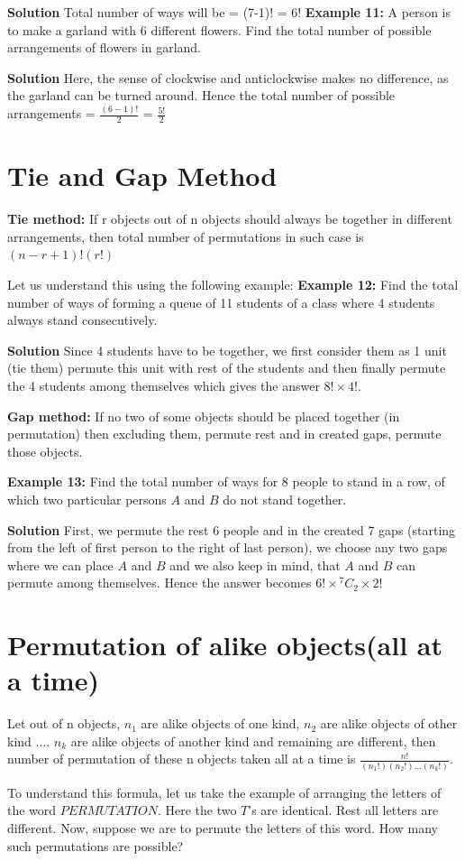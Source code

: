 \documentclass[12pt, a4paper]{article}
\begin{document}
\textbf{Solution} Total number of ways will be = (7-1)! = 6!\newline
\textbf{Example 11:} A person is to make a garland with 6 different flowers. Find the total number of possible arrangements of flowers in garland.

\textbf{Solution} Here, the sense of clockwise and anticlockwise makes no difference, as the garland can be turned around. Hence the total number of possible arrangements = $\frac{(6-1)!}{2}$ = $\frac{5!}{2}$
\section{Tie and Gap Method}
\begin{tcolorbox}[colback=TealBlue!10!White,colframe=TealBlue!50!black]
\textbf{Tie method:} If r objects out of n objects should always be together in different arrangements, then total number of permutations in such case is $(n-r+1)!(r!)$
\end{tcolorbox}
Let us understand this using the following example:\newline
\textbf{Example 12:} Find the total number of ways of forming a queue of 11 students of a class where 4 students always stand consecutively.

\textbf{Solution} Since 4 students have to be together, we first consider them as 1 unit (tie them) permute this unit with rest of the students and then finally permute the 4 students among themselves which gives the answer $8! \times 4!$.
\begin{tcolorbox}[colback=TealBlue!10!White,colframe=TealBlue!50!black]
\textbf{Gap method:} If no two of some objects should be placed together (in permutation) then excluding them, permute rest and in created gaps, permute those objects.
\end{tcolorbox}
\textbf{Example 13:} Find the total number of ways for 8 people to stand in a row, of which two particular persons $A$ and $B$ do not stand together.

\textbf{Solution} First, we permute the rest 6 people and in the created 7 gaps (starting from the left of first person to the right of last person), we choose any two gaps where we can place $A$ and $B$ and we also keep in mind, that $A$ and $B$ can permute among themselves. Hence the answer becomes $6! \times {^7C_2}\times 2!$
\section{Permutation of alike objects(all at a time)}
\begin{tcolorbox}[colback=TealBlue!10!White,colframe=TealBlue!50!black]
Let out of n objects, $n_1$ are alike objects of one kind, $n_2$ are alike objects of other kind .... $n_k$ are alike objects of another kind and remaining are different, then number of permutation of these n objects taken all at a time is $\frac{n!}{(n_{1}!)(n_{2}!)...(n_{k}!)}$.
\end{tcolorbox}
To understand this formula, let us take the example of arranging the letters of the word $PERMUTATION$. Here the two $T$'s are identical. Rest all letters are different. Now, suppose we are to permute the letters of this word. How many such permutations are possible?
\end{document}
